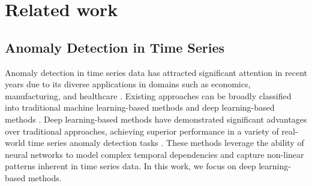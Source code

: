 \section{Related work}
\label{sec:related_work}
\subsection{Anomaly Detection in Time Series}
Anomaly detection in time series data has attracted significant attention in recent years due to its diverse applications in domains such as economics, manufacturing, and healthcare \citep{zamanzadeh2024deep}. Existing approaches can be broadly classified into traditional machine learning-based methods \citep{Salem2014AnomalyDI, 10.14778/3467861.3467863, 5437603} and deep learning-based methods \citep{Hundman2018DetectingSA, Zong2018DeepAG, 10.1145/3292500.3330672, tuli2022tranad, xu2022anomaly, zheng2022task, liu2022time}. Deep learning-based methods have demonstrated significant advantages over traditional approaches, achieving superior performance in a variety of real-world time series anomaly detection tasks \citep{zamanzadeh2024deep}. These methods leverage the ability of neural networks to model complex temporal dependencies and capture non-linear patterns inherent in time series data. In this work, we focus on deep learning-based methods.





